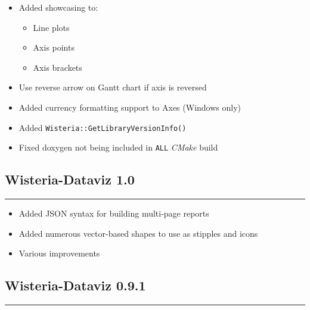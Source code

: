 \documentclass[
]{scrartcl}
\providecommand{\tightlist}{%
  \setlength{\itemsep}{0pt}\setlength{\parskip}{0pt}}
\begin{document}
\begin{itemize}
  \begin{itemize}
  \tightlist
  \item
    Bar blocks (in bar charts)
  \item
    Axis points
  \item
    Axis brackets
  \end{itemize}
\item
  Added showcasing to:

  \begin{itemize}
  \tightlist
  \item
    Line plots
  \item
    Axis points
  \item
    Axis brackets
  \end{itemize}
\item
  Use reverse arrow on Gantt chart if axis is reversed
\item
  Added currency formatting support to Axes (Windows only)
\item
  Added \texttt{Wisteria::GetLibraryVersionInfo()}
\item
  Fixed doxygen not being included in \texttt{ALL} \emph{CMake} build
\end{itemize}

\subsection*{Wisteria-Dataviz 1.0}\label{section-12}

\begin{center}\rule{0.5\linewidth}{0.5pt}\end{center}

\begin{itemize}
\tightlist
\item
  Added JSON syntax for building multi-page reports
\item
  Added numerous vector-based shapes to use as stipples and icons
\item
  Various improvements
\end{itemize}

\subsection*{Wisteria-Dataviz 0.9.1}\label{section-13}

\begin{center}\rule{0.5\linewidth}{0.5pt}\end{center}
\end{document}

